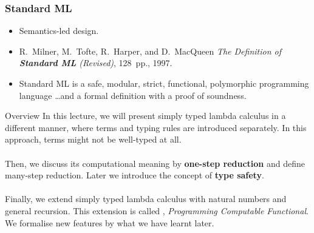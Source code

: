 \begin{frame}[c]
  \frametitle{\protect\textbf{Standard ML}}
  \begin{itemize}
    \item Semantics-led design.
    \item R.\ Milner, M.\ Tofte, R.\ Harper, and D.\ MacQueen \emph{The Definition of
        \textbf{Standard ML} (Revised)}, \alert{128~pp.}, 1997. \\
    \item Standard ML is a safe, modular, strict, functional, polymorphic
      programming language \dots and \alert{a formal definition with a proof of
        soundness}.
  \end{itemize}
\end{frame}

\begin{frame}{Overview}
  In this lecture, we will present simply typed lambda calculus 
  in a different manner, where terms and typing rules are introduced
  separately. In this approach, terms might not be well-typed at all.
  \\~\\

  Then, we discuss its computational meaning by \textbf{one-step reduction} and
  define many-step reduction.  Later we introduce the concept of
  \textbf{type safety}. 
  \\~\\

  Finally, we extend simply typed lambda calculus with natural numbers
  and general recursion. This extension is called \PCF{}, \emph{Programming
    Computable Functional}. We formalise new features
  by what we have learnt later.
\end{frame}

